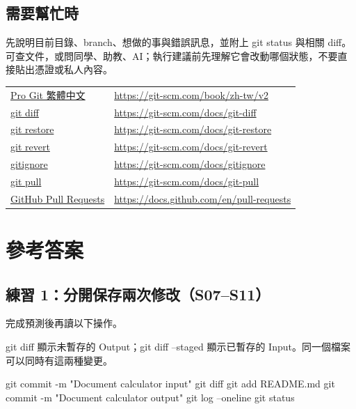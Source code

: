 \documentclass[11pt,a4paper]{article}
\DeclareRobustCommand{\code}[1]{{\small\ttfamily #1}}
\begin{document}
\subsection{需要幫忙時}

先說明目前目錄、branch、想做的事與錯誤訊息，並附上 \code{git status} 與相關 \code{diff}。可查文件，或問同學、助教、AI；執行建議前先理解它會改動哪個狀態，不要直接貼出憑證或私人內容。

{\small
\noindent\begin{tabularx}{\linewidth}{@{}l>{\raggedright\arraybackslash}X@{}}
    \href{https://git-scm.com/book/zh-tw/v2}{Pro Git 繁體中文} & \url{https://git-scm.com/book/zh-tw/v2} \\
    \href{https://git-scm.com/docs/git-diff}{git diff} & \url{https://git-scm.com/docs/git-diff} \\
    \href{https://git-scm.com/docs/git-restore}{git restore} & \url{https://git-scm.com/docs/git-restore} \\
    \href{https://git-scm.com/docs/git-revert}{git revert} & \url{https://git-scm.com/docs/git-revert} \\
    \href{https://git-scm.com/docs/gitignore}{gitignore} & \url{https://git-scm.com/docs/gitignore} \\
    \href{https://git-scm.com/docs/git-pull}{git pull} & \url{https://git-scm.com/docs/git-pull} \\
    \href{https://docs.github.com/en/pull-requests}{GitHub Pull Requests} & \url{https://docs.github.com/en/pull-requests} \\
\end{tabularx}
}

\clearpage
\section{參考答案}

\subsection{練習 1：分開保存兩次修改（S07–S11）}
\label{answer:staging}

完成預測後再讀以下操作。

\code{git diff} 顯示未暫存的 Output；\code{git diff --staged} 顯示已暫存的 Input。同一個檔案可以同時有這兩種變更。

\begin{Code}
git commit -m "Document calculator input"
git diff
git add README.md
git commit -m "Document calculator output"
git log --oneline
git status
\end{Code}
\end{document}
